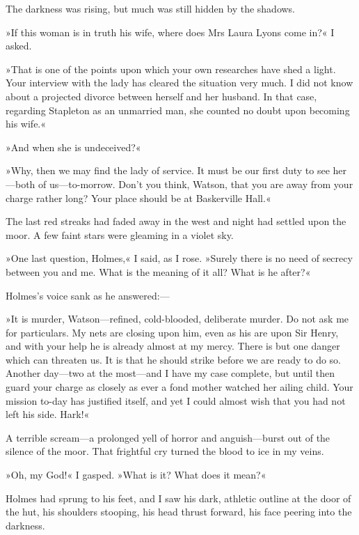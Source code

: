 The darkness was rising, but much was still hidden by the shadows.

»If this woman is in truth his wife, where does Mrs Laura Lyons come in?« I asked.

»That is one of the points upon which your own researches have shed a light. Your interview with the lady has cleared the situation very much. I did not know about a projected divorce between herself and her husband. In that case, regarding Stapleton as an unmarried man, she counted no doubt upon becoming his wife.«

»And when she is undeceived?«

»Why, then we may find the lady of service. It must be our first duty to see her\allowbreak---\allowbreak both of us\allowbreak---\allowbreak to-morrow. Don't you think, Watson, that you are away from your charge rather long? Your place should be at Baskerville Hall.«

The last red streaks had faded away in the west and night had settled upon the moor. A few faint stars were gleaming in a violet sky.

»One last question, Holmes,« I said, as I rose. »Surely there is no need of secrecy between you and me. What is the meaning of it all? What is he after?«

Holmes's voice sank as he answered:\allowbreak---\allowbreak  

»It is murder, Watson\allowbreak---\allowbreak refined, cold-blooded, deliberate mur\-der. Do not ask me for particulars. My nets are closing upon him, even as his are upon Sir Henry, and with your help he is already almost at my mercy. There is but one danger which can threaten us. It is that he should strike before we are ready to do so. Another day\allowbreak---\allowbreak two at the most\allowbreak---\allowbreak and I have my case complete, but until then guard your charge as closely as ever a fond mother watched her ailing child. Your mission to-day has justified itself, and yet I could almost wish that you had not left his side. Hark!«

A terrible scream\allowbreak---\allowbreak a prolonged yell of horror and anguish\allowbreak---\allowbreak burst out of the silence of the moor. That frightful cry turned the blood to ice in my veins.

»Oh, my God!« I gasped. »What is it? What does it mean?«

Holmes had sprung to his feet, and I saw his dark, athletic outline at the door of the hut, his shoulders stooping, his head thrust forward, his face peering into the darkness.

